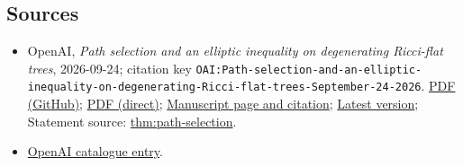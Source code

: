 \documentclass[11pt]{article}
\begin{document}
\subsection{Sources}
\begin{itemize}
\item OpenAI, \emph{Path selection and an elliptic inequality on degenerating Ricci-flat trees}, 2026-09-24; citation key \texttt{OAI:Path-selection-and-an-elliptic-inequality-on-degenerating-Ricci-flat-trees-September-24-2026}. \href{https://github.com/openai/math/blob/adc7f1241b42e322a6451854ab7e4b4c146bf78a/preprints/Path-selection-and-an-elliptic-inequality-on-degenerating-Ricci-flat-trees-September-24-2026/paper.pdf}{PDF (GitHub)}; \href{https://github.com/openai/math/raw/adc7f1241b42e322a6451854ab7e4b4c146bf78a/preprints/Path-selection-and-an-elliptic-inequality-on-degenerating-Ricci-flat-trees-September-24-2026/paper.pdf}{PDF (direct)}; \href{https://github.com/openai/math/blob/adc7f1241b42e322a6451854ab7e4b4c146bf78a/preprints/Path-selection-and-an-elliptic-inequality-on-degenerating-Ricci-flat-trees-September-24-2026/README.md}{Manuscript page and citation}; \href{https://github.com/openai/math/blob/main/preprints/Path-selection-and-an-elliptic-inequality-on-degenerating-Ricci-flat-trees-September-24-2026/paper.pdf}{Latest version}; Statement source: \href{https://github.com/openai/math/blob/adc7f1241b42e322a6451854ab7e4b4c146bf78a/preprints/Path-selection-and-an-elliptic-inequality-on-degenerating-Ricci-flat-trees-September-24-2026/build/sections/03-path.tex\#L66}{thm:path-selection}.
\item \href{https://github.com/openai/math/blob/adc7f1241b42e322a6451854ab7e4b4c146bf78a/CONTENTS.md}{OpenAI catalogue entry}.
\end{itemize}
\end{document}
